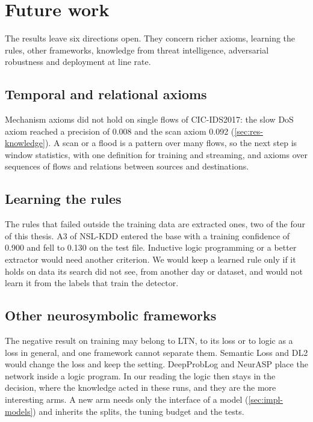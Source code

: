 \section{Future work}
\label{sec:future-work}

The results leave six directions open. They concern richer axioms, learning the rules,
other frameworks, knowledge from threat intelligence, adversarial robustness and deployment
at line rate.

\subsection{Temporal and relational axioms}
\label{sec:fw-logics}

Mechanism axioms did not hold on single flows of CIC-IDS2017: the slow DoS axiom reached a precision
of 0.008 and the scan axiom 0.092 (\cref{sec:res-knowledge}). A scan or a flood is a pattern over
many flows, so the next step is window statistics, with one definition for training and streaming,
and axioms over sequences of flows and relations between sources and destinations.

\subsection{Learning the rules}
\label{sec:fw-learning-rules}

The rules that failed outside the training data are extracted ones, two of the four of this thesis.
A3 of NSL-KDD entered the base with a training confidence of 0.900 and fell to 0.130 on the test
file. Inductive logic programming or a better extractor would need another criterion. We would keep
a learned rule only if it holds on data its search did not see, from another day or dataset, and
would not learn it from the labels that train the detector.

\subsection{Other neurosymbolic frameworks}
\label{sec:fw-frameworks}

The negative result on training may belong to LTN, to its loss or to logic as a loss in general, and
one framework cannot separate them. Semantic Loss and DL2 would change the loss and keep the setting.
DeepProbLog and NeurASP place the network inside a logic program. In our reading the logic then
stays in the decision, where the knowledge acted in these runs, and they are the more interesting
arms. A new arm needs only the interface of a model
(\cref{sec:impl-models}) and inherits the splits, the tuning budget and the tests.

